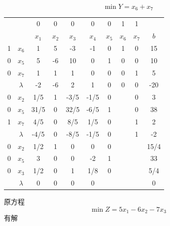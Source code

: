 \documentclass[../../main.tex]{subfiles}
\begin{document}
\begin{solution}
    \begin{equation*}
        \min Y = x_6+x_7
    \end{equation*}
    \begin{table}[H]
        \centering
        \begin{tabular}{c|c|cccccccc}

              &             & 0       & 0       & 0       & 0       & 0       & 1       & 1       &       \\
              &             & \(x_1\) & \(x_2\) & \(x_3\) & \(x_4\) & \(x_5\) & \(x_6\) & \(x_7\) & \(b\) \\
            1 & \(x_6\)     & 1       & 5       & -3      & -1      & 0       & 1       & 0       & 15    \\
            0 & \(x_5\)     & 5       & -6      & 10      & 0       & 1       & 0       & 0       & 10    \\
            0 & \(x_7\)     & 1       & 1       & 1       & 0       & 0       & 0       & 1       & 5     \\
              & \(\lambda\) & -2      & -6      & 2       & 1       & 0       & 0       & 0       & -20   \\
            \hline
            0 & \(x_2\)     & 1/5     & 1       & -3/5    & -1/5    & 0       &         & 0       & 3     \\
            0 & \(x_5\)     & 31/5    & 0       & 32/5    & -6/5    & 1       &         & 0       & 38    \\
            1 & \(x_7\)     & 4/5     & 0       & 8/5     & 1/5     & 0       &         & 1       & 2     \\
              & \(\lambda\) & -4/5    & 0       & -8/5    & -1/5    & 0       &         & 1       & -2    \\
            \hline
            0 & \(x_2\)     & 1/2     & 1       & 0       & 0       & 0       &         &         & 15/4  \\
            0 & \(x_5\)     & 3       & 0       & 0       & -2      & 1       &         &         & 33    \\
            0 & \(x_3\)     & 1/2     & 0       & 1       & 1/8     & 0       &         &         & 5/4   \\
              & \(\lambda\) & 0       & 0       & 0       & 0       &         &         &         & 0     \\
        \end{tabular}
    \end{table}
    原方程
    \begin{equation*}
        \min Z = 5x_1-6x_2-7x_3
    \end{equation*}
    有解
    \begin{table}[H]
        \centering
        \begin{tabular}{c|c|cccccc}


\end{tabular}
\end{table}
\end{solution}
\end{document}
